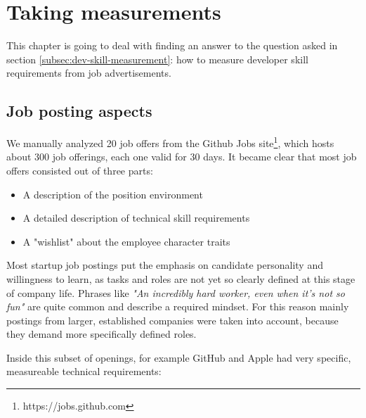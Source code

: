 \chapter{Taking measurements}
This chapter is going to deal with finding an answer
to the question asked in section \ref{subsec:dev-skill-measurement}:
how to measure developer skill requirements from job advertisements.

%

\section{Job posting aspects}
We manually analyzed 20 job offers from the Github Jobs
site\footnote{https://jobs.github.com}, which hosts about 300 job offerings,
each one valid for 30 days. It became clear that most
job offers consisted out of three parts:

\begin{itemize}
\item A description of the position environment
\item A detailed description of technical skill requirements
\item A "wishlist" about the employee character traits
\end{itemize}

Most startup job postings put the emphasis on candidate personality and
willingness to learn, as tasks and roles are not yet so clearly defined
at this stage of company life. Phrases like \textit{"An incredibly hard worker, even when it's not so fun"}
are quite common and describe a required mindset.
For this reason mainly postings from larger, established companies were taken into account,
because they demand more specifically defined roles.
\newline

Inside this subset of openings, for example GitHub and Apple had very
specific, measureable technical requirements:
\newline


